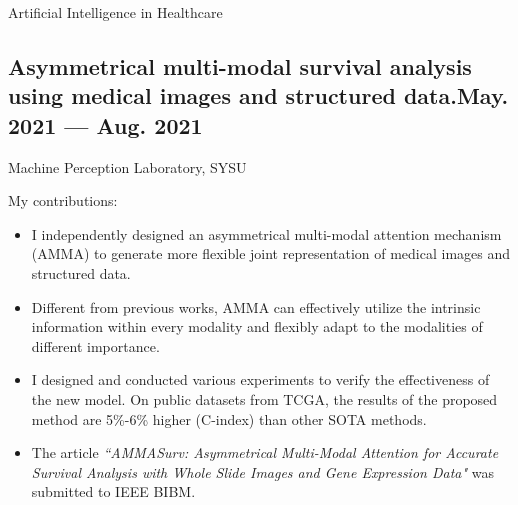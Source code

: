 \documentclass[a4,11pt]{article}
\newcommand{\subtext}[1]{
#1\par\vspace{-0.2cm}}
\begin{document}


\centerline{\textcolor{UI_blue}{Artificial Intelligence in Healthcare}}
\vspace {6pt}
\subsection*{Asymmetrical multi-modal survival analysis using medical images and structured data.\hfill May. 2021 --- Aug. 2021} 
\subtext{Machine Perception Laboratory, SYSU }
\vspace {6pt}
My contributions:
    \begin{itemize}[topsep = 0 pt, itemsep = 0 pt, parsep = 1 pt]
       \item I independently designed an asymmetrical multi-modal attention mechanism (AMMA) to generate more flexible joint representation of medical images and structured data. 
		\item Different from previous works, AMMA can effectively utilize the intrinsic information within every modality and flexibly adapt to the modalities of different importance.
		\item I designed and conducted various experiments to verify the effectiveness of the new model.  On public datasets from TCGA, the results of the proposed method are 5\%-6\% higher (C-index) than other SOTA methods. 
        \item The article \textit{``AMMASurv: Asymmetrical Multi-Modal Attention for Accurate Survival Analysis with Whole Slide Images and Gene Expression Data"} was submitted to IEEE BIBM.
    \end{itemize}
\end{document}
